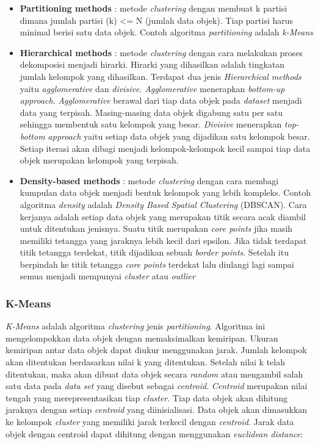 \begin{itemize}

\item \textbf{Partitioning methods} : metode \textit{clustering} dengan membuat k partisi dimana jumlah partisi (k) <= N (jumlah data objek). Tiap partisi harus minimal berisi satu data objek. Contoh algoritma \textit{partitioning} adalah \textit{k-Means} 

\item \textbf{Hierarchical methods} : metode \textit{clustering} dengan cara melakukan proses dekomposisi menjadi hirarki. Hirarki yang dihasilkan adalah tingkatan jumlah kelompok yang dihasilkan. Terdapat dua jenis \textit{Hierarchical methods} yaitu \textit{agglomerative} dan \textit{divisive}. \textit{Agglomerative} menerapkan \textit{bottom-up approach}. \textit{Agglomerative} berawal dari tiap data objek pada \textit{dataset} menjadi data yang terpisah. Masing-masing data objek digabung satu per satu sehingga membentuk satu kelompok yang besar. \textit{Divisive} menerapkan \textit{top-bottom approach} yaitu setiap data objek yang dijadikan satu kelompok besar. Setiap iterasi akan dibagi menjadi kelompok-kelompok kecil sampai tiap data objek merupakan kelompok yang terpisah.

\item \textbf{Density-based methods} : metode \textit{clustering} dengan cara membagi kumpulan data objek menjadi bentuk kelompok yang lebih kompleks. Contoh algoritma \textit{density} adalah \textit{Density Based Spatial Clustering} (DBSCAN). Cara kerjanya adalah setiap data objek yang merupakan titik secara acak diambil  untuk ditentukan jenisnya. Suatu titik merupakan \textit{core points} jika masih memiliki tetangga yang jaraknya lebih kecil dari epsilon. Jika tidak terdapat titik tetangga terdekat, titik dijadikan sebuah \textit{border points}. Setelah itu berpindah ke titik tetangga \textit{core points} terdekat lalu diulangi lagi sampai semua menjadi mempunyai \textit{cluster} atau \textit{outlier}
\end{itemize}

\subsubsection{K-Means}
\textit{K-Means} adalah algoritma \textit{clustering} jenis \textit{partitioning}. Algoritma ini mengelompokkan data objek dengan memaksimalkan kemiripan. Ukuran kemiripan antar data objek dapat diukur menggunakan jarak. Jumlah kelompok akan ditentukan berdasarkan nilai k yang ditentukan. Setelah nilai k telah ditentukan, maka akan dibuat data objek secara \textit{random} atau mengambil salah satu data pada \textit{data set} yang disebut sebagai \textit{centroid}. \textit{Centroid} merupakan nilai tengah yang merepresentasikan tiap \textit{cluster}. Tiap data objek akan dihitung jaraknya dengan setiap \textit{centroid} yang diinisialisasi. Data objek akan dimasukkan ke kelompok \textit{cluster} yang memiliki jarak terkecil dengan \textit{centroid}. Jarak data objek dengan centroid dapat dihitung dengan menggunakan \textit{euclidean distance}: 

